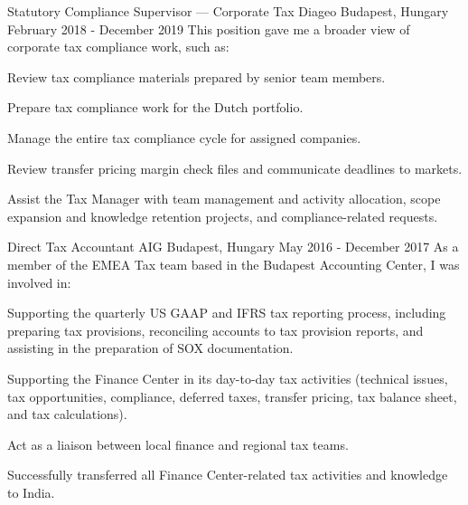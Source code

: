 \begin{cventries}

  \cventry
    {Statutory Compliance Supervisor — Corporate Tax} %
    {Diageo} %
    {Budapest, Hungary} %
    {February 2018 - December 2019} %
    {This position gave me a broader view of corporate tax compliance work, such as:} %
    {
      \begin{cvitems} %
        \item {Review tax compliance materials prepared by senior team members.}
        \item {Prepare tax compliance work for the Dutch portfolio.}
        \item {Manage the entire tax compliance cycle for assigned companies.}
        \item {Review transfer pricing margin check files and communicate deadlines to markets.}
        \item {Assist the Tax Manager with team management and activity allocation, scope expansion and knowledge retention projects, and compliance-related requests.}
      \end{cvitems}
  }


  \cventry
    {Direct Tax Accountant} %
    {AIG} %
    {Budapest, Hungary} %
    {May 2016 - December 2017} %
    {As a member of the EMEA Tax team based in the Budapest Accounting Center, I was involved in:} %
    {
      \begin{cvitems} %
        \item {Supporting the quarterly US GAAP and IFRS tax reporting process, including preparing tax provisions, reconciling accounts to tax provision reports, and assisting in the preparation of SOX documentation.}
        \item {Supporting the Finance Center in its day-to-day tax activities (technical issues, tax opportunities, compliance, deferred taxes, transfer pricing, tax balance sheet, and tax calculations).}
        \item {Act as a liaison between local finance and regional tax teams.}
        \item {Successfully transferred all Finance Center-related tax activities and knowledge to India.}
      \end{cvitems}
  }


\end{cventries}
